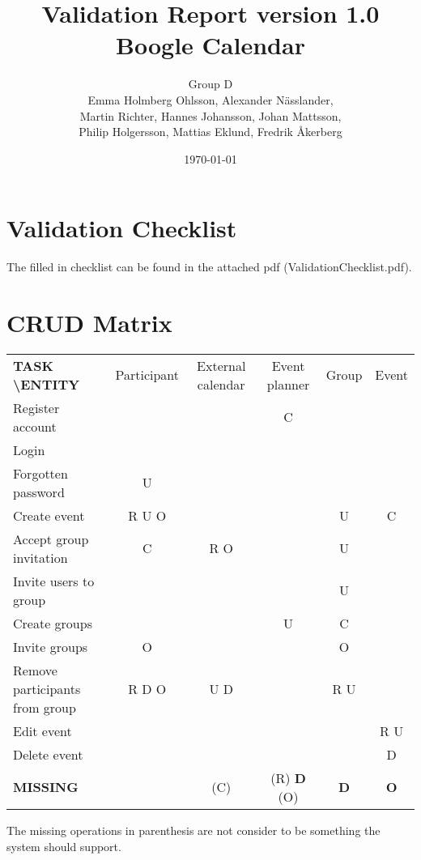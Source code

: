 \documentclass[a4paper]{article}
\title{Validation Report version 1.0\\ Boogle Calendar}
\author{Group D\\ Emma Holmberg Ohlsson, Alexander Nässlander,\\Martin Richter, Hannes Johansson, Johan Mattsson,\\Philip Holgersson, Mattias Eklund, Fredrik Åkerberg}
\date{\today}
\begin{document}
	\maketitle
	\thispagestyle{empty}
	\setcounter{page}{0}
	\pagebreak
	
	\section{Validation Checklist}
		
		The filled in checklist can be found in the attached pdf (ValidationChecklist.pdf).

	\section{CRUD Matrix}
			\begin{center}
		
		
			\begin{tabular}{|l||c|c|c|c|c|}
			\hline 
			\textbf{TASK \textbackslash ENTITY} & Participant & External calendar & Event planner & Group & Event \\ 
			\hhline{|=||=|=|=|=|=|}
			Register account & & & C & & \\ 
			\hline 
			Login & & & & & \\ 
			\hline 
			Forgotten password & U & & & & \\ 
			\hline 
			Create event & R U O & & & U & C \\ 
			\hline 
			Accept group invitation & C & R O & & U & \\ 
			\hline 
			Invite users to group & & & & U & \\ 
			\hline 
			Create groups & & & U & C & \\ 
			\hline 
			Invite groups & O & & & O & \\ 
			\hline 
			Remove participants from group & R D O & U D & & R U & \\ 
			\hline 
			Edit event & & & & & R U \\ 
			\hline 
			Delete event & & & & & D \\ 
			\hhline{|=||=|=|=|=|=|}
			\textbf{MISSING} & & (C) & (R) \textbf{D} (O) & \textbf{D} & \textbf{O} \\ 
			\hline 
			\end{tabular} 
	
		\end{center}	
		The missing operations in parenthesis are not consider to be something the system should support.
	
\end{document}
